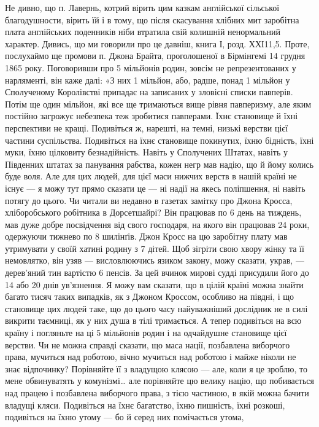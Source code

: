 Не дивно, що п. Лавернь, котрий вірить цим казкам англійської сільської
благодушности, вірить їй і в тому, що після скасування хлібних мит заробітна плата
англійських поденників ніби втратила свій колишній ненормальний характер.
Дивись, що ми говорили про це давніш, книга І, розд. ХХІ11,5. Проте, послухаймо
ще промови п. Джона Брайта, проголошеної в Бірмінгемі 14 грудня 1865 року.
Поговоривши про 5 мільйонів родин, зовсім не репрезентованих у нарляменті,
він каже далі: «З них 1 мільйон, або, радше, понад 1 мільйон у Сполученому
Королівстві припадає на записаних у зловісні списки павперів. Потім ще один
мільйон, які все ще тримаються вище рівня павперизму, але яким постійно
загрожує небезпека теж зробитися павперами. Їхнє становище й їхні перспективи
не кращі. Подивіться ж, нарешті, на темні, низькі верстви цієї частини суспільства.
Подивіться на їхнє становище покинутих, їхню бідність, їхні муки, їхню цілковиту
безнадійність. Навіть у Сполучених Штатах, навіть у Південних штатах за
панування рабства, кожен негр мав надію, що й йому колись буде воля.
Але для цих людей, для цієї маси нижчих верств в нашій країні не існує —
я можу тут прямо сказати це — ні надії на якесь поліпшення, ні навіть
потягу до цього. Чи читали ви недавно в газетах замітку про Джона Кросса,
хліборобського робітника в Дорсетшайрі? Він працював по 6 день на тиждень,
мав дуже добре посвідчення від свого господаря, на якого він працював 24 роки,
одержуючи тижнево по 8 шилінґів. Джон Кросс на цю заробітну плату мав
утримувати у своїй хатині родину з 7 дітей. Щоб зігріти свою хвору жінку та
її немовлятко, він узяв — висловлюючись язиком закону, можу сказати, украв, —
дерев’яний тин вартістю 6 пенсів. За цей вчинок мирові судді присудили його
до 14 або 20 днів ув’язнення. Я можу вам сказати, що в цілій країні можна
знайти багато тисяч таких випадків, як з Джоном Кроссом, особливо на півдні,
і що становище цих людей таке, що до цього часу найуважніший дослідник не
в силі викрити таємниці, як у них душа в тілі тримається. А тепер подивіться
на всю країну і погляньте на ці 5 мільйонів родин і на одчайдушне становище
цієї верстви. Чи не можна справді сказати, що маса нації, позбавлена
виборчого права, мучиться над роботою, вічно мучиться над роботою і майже
ніколи не знає відпочинку? Порівняйте її з владущою клясою — але, коли я це
зроблю, то мене обвинуватять у комунізмі\dots{} але порівняйте цю велику націю,
що побивається над працею і позбавлена виборчого права, з тією частиною,
в якій можна бачити владущі кляси. Подивіться на їхнє багатство, їхню пишність,
їхні розкоші, подивіться на їхню утому — бо й серед них помічається утома,
\parbreak{}  %
